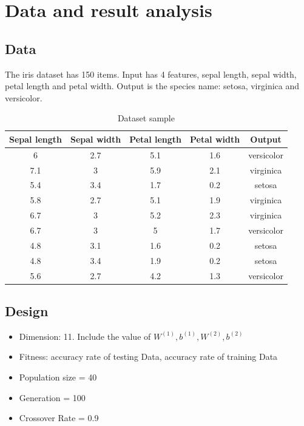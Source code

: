 \documentclass[conference]{IEEEtran}
\begin{document}
\section{Data and result analysis}
\subsection{Data}
The iris dataset has 150 items. Input has 4 features, sepal length, sepal width, petal length and petal width. Output is the species name: setosa, virginica and versicolor.

\begin{table}[htbp]
\caption{Dataset sample}
\begin{center}
\begin{tabular}{|c|c|c|c|c|}
\hline
Sepal length & Sepal width & Petal length & Petal width & Output \\
\hline
6 & 2.7 & 5.1 & 1.6 & versicolor \\
\hline
7.1 & 3 & 5.9 & 2.1 & virginica \\
\hline
5.4 & 3.4 & 1.7 & 0.2 & setosa \\
\hline
5.8 & 2.7 & 5.1 & 1.9 & virginica \\
\hline
6.7 & 3 & 5.2 & 2.3 & virginica \\
\hline
6.7 & 3 & 5 & 1.7 & versicolor \\
\hline
4.8 & 3.1 & 1.6 & 0.2 & setosa \\
\hline
4.8 & 3.4 & 1.9 & 0.2 & setosa \\
\hline
5.6 & 2.7 & 4.2 & 1.3 & versicolor \\
\hline
\end{tabular}
\label{dataset_sample}
\end{center}
\end{table}

\subsection{Design}
\begin{itemize}
\item Dimension: 11. Include the value of $W^{(1)}, b^{(1)}, W^{(2)}, b^{(2)}$
\item Fitness: accuracy rate of testing Data, accuracy rate of training Data
\item Population size = 40
\item Generation = 100
\item Crossover Rate = 0.9
\end{itemize}
\end{document}
